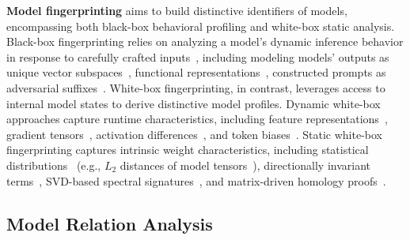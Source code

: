 \textbf{Model fingerprinting} aims to build distinctive identifiers of models, encompassing both black-box behavioral profiling and white-box static analysis. Black-box fingerprinting relies on analyzing a model's dynamic inference behavior in response to carefully crafted inputs~\cite{guan2022you, peng2022fingerprinting, yang2022metafinger}, including modeling models' outputs as unique vector subspaces~\cite{pasquini2025llmmap, oyama2025mapping}, functional representations~\cite{wu2025llm}, constructed prompts as adversarial suffixes~\cite{gubri2024trap, yamabe2025mergeprint, xu2026dnf}. White-box fingerprinting, in contrast, leverages access to internal model states to derive distinctive model profiles. Dynamic white-box approaches capture runtime characteristics, including feature representations~\cite{zhang2024reef}, gradient tensors~\cite{wu2025tensorguard}, activation differences~\cite{xu2025delta}, and token biases~\cite{tong2025seedprints}. Static white-box fingerprinting captures intrinsic weight characteristics, including statistical distributions~\cite{yoon2025intrinsic} (e.g., $L_2$ distances of model tensors~\cite{horwitz2024unsupervised}), directionally invariant terms~\cite{zeng2024huref}, SVD-based spectral signatures~\cite{wang2025ghost}, and matrix-driven homology proofs~\cite{zhang2025matrix}.


\subsection{Model Relation Analysis}

